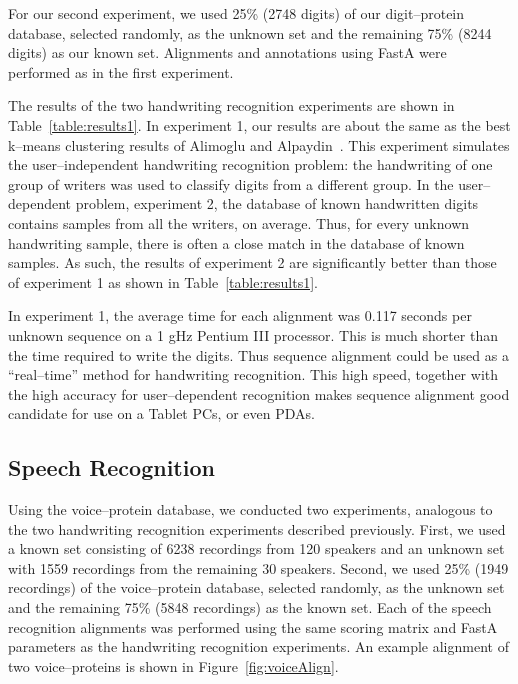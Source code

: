 		For our second experiment, we used 25\% (2748 digits) of our
		digit--protein database, selected randomly, as the unknown
		set and the remaining 75\% (8244 digits) as our known set.
		Alignments and annotations using FastA were performed as
		in the first experiment.

		The results of the two handwriting recognition
		experiments are shown in Table~\vref{table:results1}.
		In experiment 1, our results are about the same as
		the best k--means clustering results of Alimoglu and
		Alpaydin~\cite{alimoglu1996methods,alimoglu1997combining}.
		This experiment simulates the user--independent
		handwriting recognition problem: the handwriting of one
		group of writers was used to classify digits from a different group.
		In the user--dependent problem, experiment 2, the database
		of known handwritten digits contains samples from all the writers,
		on average.  Thus, for every unknown handwriting sample,
		there is often a close match in the database of known
		samples.  As such, the results of experiment 2 are
		significantly better than those of experiment 1 as shown
		in Table~\vref{table:results1}.




		In experiment 1, the average time for each alignment was
		0.117 seconds per unknown sequence on a 1 gHz Pentium III
		processor.  This is much shorter than the time required to
		write the digits.  Thus sequence alignment could be used
		as a ``real--time'' method for handwriting recognition.
		This high speed, together with the high accuracy for
		user--dependent recognition makes sequence alignment good
		candidate for use on a Tablet PCs, or even PDAs.

	\subsection{Speech Recognition}


		Using the voice--protein database, we conducted two
		experiments, analogous to the two handwriting recognition
		experiments described previously.  First, we used a known
		set consisting of 6238 recordings from 120 speakers and
		an unknown set with 1559 recordings from the remaining 30
		speakers.  Second, we used 25\% (1949 recordings) of the
		voice--protein database, selected randomly, as the unknown
		set and the remaining 75\% (5848 recordings) as the known
		set.  Each of the speech recognition alignments was performed
		using the same scoring matrix and FastA parameters as the
		handwriting recognition experiments.  An example alignment
		of two voice--proteins is shown in Figure~\vref{fig:voiceAlign}.


